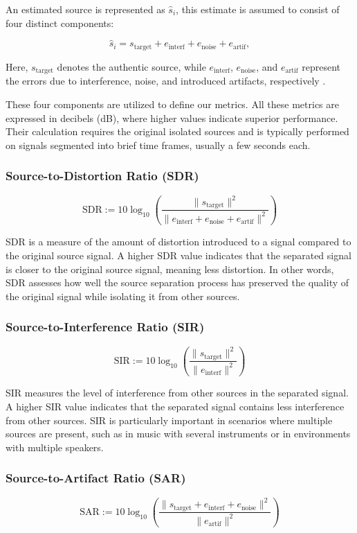 \documentclass[conference]{IEEEtran}
\begin{document}
An estimated source is represented as $\hat{s}_i$, this estimate is assumed to consist of four distinct components:

$$
\hat{s}_i = s_{\text{target}} + e_{\text{interf}} + e_{\text{noise}} + e_{\text{artif}},
$$


Here, $s_{\text{target}}$ denotes the authentic source, while $e_{\text{interf}}$, $e_{\text{noise}}$, and $e_{\text{artif}}$ represent the errors due to interference, noise, and introduced artifacts, respectively \cite{vincent2006performance}.

These four components are utilized to define our metrics. All these metrics are expressed in decibels (dB), where higher values indicate superior performance. Their calculation requires the original isolated sources and is typically performed on signals segmented into brief time frames, usually a few seconds each.

\subsubsection{Source-to-Distortion Ratio (SDR)}
$$
\text{SDR} := 10 \log_{10} \left( \frac{\| s_{\text{target}} \|^2}{ \| e_{\text{interf}} + e_{\text{noise}} + e_{\text{artif}} \|^2} \right)
$$


SDR is a measure of the amount of distortion introduced to a signal compared to the original source signal. A higher SDR value indicates that the separated signal is closer to the original source signal, meaning less distortion. In other words, SDR assesses how well the source separation process has preserved the quality of the original signal while isolating it from other sources.

\subsubsection{Source-to-Interference Ratio (SIR)}
$$
\text{SIR} := 10 \log_{10} \left( \frac{\| s_{\text{target}} \|^2}{ \| e_{\text{interf}} \|^2} \right)
$$


SIR measures the level of interference from other sources in the separated signal. A higher SIR value indicates that the separated signal contains less interference from other sources. SIR is particularly important in scenarios where multiple sources are present, such as in music with several instruments or in environments with multiple speakers. 

\subsubsection{Source-to-Artifact Ratio (SAR)}
$$
\text{SAR} := 10 \log_{10} \left( \frac{\| s_{\text{target}} + e_{\text{interf}} + e_{\text{noise}} \|^2}{ \| e_{\text{artif}} \|^2} \right)
$$
\end{document}
